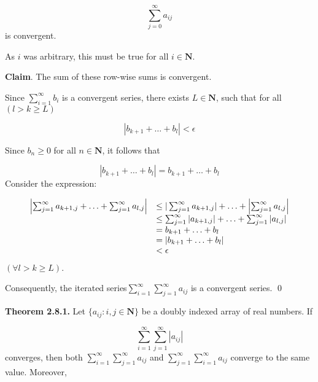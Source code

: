 \documentclass[10pt]{article}
\begin{document}
\begin{equation*}
\sum _{j=0}^{\infty } a_{ij}
\end{equation*}
is convergent.



As $\displaystyle i$ was arbitrary, this must be true for all $\displaystyle i\in \mathbf{N}$.



\textbf{Claim}. The sum of these row-wise sums is convergent.



Since $\displaystyle \sum _{i=1}^{\infty } b_{i}$ is a convergent series, there exists $\displaystyle L\in \mathbf{N}$, such that for all $\displaystyle ( l >k\geq L)$


\begin{equation*}
|b_{k+1} +\dotsc +b_{l} |< \epsilon 
\end{equation*}


 Since $\displaystyle b_{n} \geq 0$ for all $\displaystyle n\in \mathbf{N}$, it follows that


\begin{equation*}
|b_{k+1} +\dotsc +b_{l} |=b_{k+1} +\dotsc +b_{l}
\end{equation*}
Consider the expression:


\begin{equation*}
\begin{array}{ c l }
\left| \sum _{j=1}^{\infty } a_{k+1,j} +\dotsc +\sum _{j=1}^{\infty } a_{l,j}\right|  & \leq | \sum _{j=1}^{\infty } a_{k+1,j}| +\dotsc +\left| \sum _{j=1}^{\infty } a_{l,j}\right| \\
 & \leq \sum _{j=1}^{\infty }| a_{k+1,j}| +\dotsc +\sum _{j=1}^{\infty }| a_{l,j}| \\
 & =b_{k+1} +\dotsc +b_{l}\\
 & =| b_{k+1} +\dotsc +b_{l}| \\
 & < \epsilon 
\end{array}
\end{equation*}
$\displaystyle ( \forall l >k\geq L)$. 



Consequently, the iterated series$\displaystyle \sum _{i=1}^{\infty }\sum _{j=1}^{\infty } a_{ij}$ is a convergent series. \qed 

\textbf{Theorem 2.8.1.} Let $\displaystyle \{a_{ij} :i,j\in \mathbf{N}\}$ be a doubly indexed array of real numbers. If


\begin{equation*}
\sum _{i=1}^{\infty }\sum _{j=1}^{\infty } |a_{ij} |
\end{equation*}
converges, then both $\displaystyle \sum _{i=1}^{\infty }\sum _{j=1}^{\infty } a_{ij}$ and $\displaystyle \sum _{j=1}^{\infty }\sum _{i=1}^{\infty } a_{ij}$ converge to the same value. Moreover,
\end{document}
